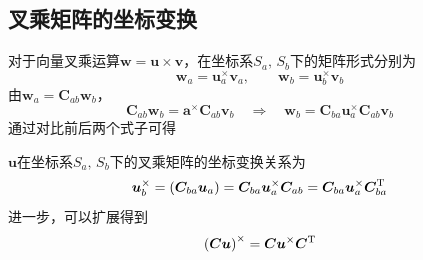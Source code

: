 \subsection{叉乘矩阵的坐标变换}
\label{叉乘矩阵的坐标变换}
对于向量叉乘运算$\bm{w} = \bm{u} \times \bm{v}$，在坐标系$S_a,\, S_b$下的矩阵形式分别为
\begin{equation*}
	\bm{w}_a = \bm{u}_a^\times \bm{v}_a, \qquad \bm{w}_b = \bm{u}_b^\times \bm{v}_b
\end{equation*}
由$\bm{w}_a = \bm{C}_{ab} \bm{w}_b$，
\begin{equation*}
	\bm{C}_{ab} \bm{w}_b = \bm{a}^\times \bm{C}_{ab} \bm{v}_b \quad \Rightarrow \quad \bm{w}_b = \bm{C}_{ba} \bm{u}_a^\times \bm{C}_{ab} \bm{v}_b
\end{equation*}
通过对比前后两个式子可得

{
	$\bm{u}$在坐标系$S_a, \, S_b$下的叉乘矩阵的坐标变换关系为
	\begin{equation}
		\bm{u}_b^\times = \left(\bm{C}_{ba} \bm{u}_a \right) = \bm{C}_{ba} \bm{u}_a^\times \bm{C}_{ab}
		= \bm{C}_{ba} \bm{u}_a^\times \bm{C}_{ba}^{\text{T}}
	\end{equation}
	进一步，可以扩展得到
	\begin{equation}
		\left( \bm{C} \bm{u} \right)^\times = \bm{C} \bm{u}^\times \bm{C}^{\text{T}}
	\end{equation}
}


